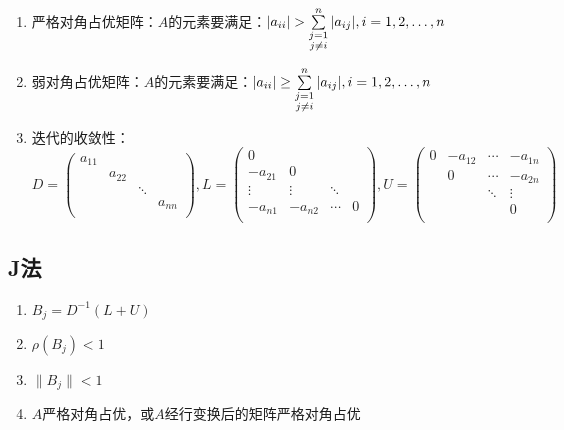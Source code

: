 \documentclass[UTF8,a4paper,11pt,oneside]{ctexbook}
\begin{document}
\begin{enumerate}
    \item 严格对角占优矩阵：\(A\)的元素要满足：\(|a_{ii}|>\sum\limits_{\begin{subarray}{c}
        j=1\\
        j\neq i
    \end{subarray}}^n|a_{ij}|,i=1,2,\ldots,n\)
    \item 弱对角占优矩阵：\(A\)的元素要满足：\(|a_{ii}|\geq\sum\limits_{\begin{subarray}{c}
        j=1\\
        j\neq i
    \end{subarray}}^n|a_{ij}|,i=1,2,\ldots,n\)
    \item 迭代的收敛性：\\\(D=\begin{pmatrix}
        a_{11} & & & \\
        & a_{22} & &\\
        & & \ddots &\\
        & & & a_{nn}\\
    \end{pmatrix},
    L=\begin{pmatrix}
        0 & & &\\
        -a_{21} & 0 & &\\
        \vdots & \vdots & \ddots &\\
        -a_{n1} & -a_{n2} & \cdots & 0\\
    \end{pmatrix},
    U=\begin{pmatrix}
        0 & -a_{12} & \cdots & -a_{1n}\\
        & 0 & \cdots & -a_{2n}\\
        & & \ddots & \vdots\\
        & & & 0\\
    \end{pmatrix}\)
\end{enumerate}

\subsection{J法}
\begin{enumerate}
    \item \(B_j=D^{-1}(L+U)\)
    \item \(\rho(B_j)<1\)
    \item \(\|B_j\|<1\)
    \item \(A\)严格对角占优，或\(A\)经行变换后的矩阵严格对角占优
\end{enumerate}
\end{document}
